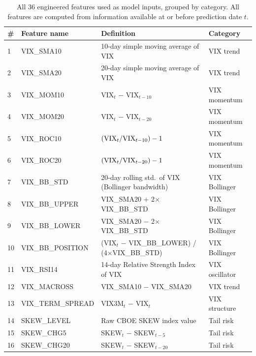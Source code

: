\documentclass[12pt]{article}
\begin{document}
\begin{table}[H]
\centering
\caption{All 36 engineered features used as model inputs, grouped by category. All features are computed from information available at or before prediction date $t$.}
\label{tab:features}
\small
\begin{tabular}{llll}
\toprule
\# & Feature name & Definition & Category \\
\midrule
1  & VIX\_SMA10        & 10-day simple moving average of VIX                        & VIX trend \\
2  & VIX\_SMA20        & 20-day simple moving average of VIX                        & VIX trend \\
3  & VIX\_MOM10        & VIX$_t$ $-$ VIX$_{t-10}$                                  & VIX momentum \\
4  & VIX\_MOM20        & VIX$_t$ $-$ VIX$_{t-20}$                                  & VIX momentum \\
5  & VIX\_ROC10        & $({\rm VIX}_t / {\rm VIX}_{t-10}) - 1$                     & VIX momentum \\
6  & VIX\_ROC20        & $({\rm VIX}_t / {\rm VIX}_{t-20}) - 1$                     & VIX momentum \\
7  & VIX\_BB\_STD      & 20-day rolling std.\ of VIX (Bollinger bandwidth)          & VIX Bollinger \\
8  & VIX\_BB\_UPPER    & VIX\_SMA20 $+$ 2$\times$VIX\_BB\_STD                       & VIX Bollinger \\
9  & VIX\_BB\_LOWER    & VIX\_SMA20 $-$ 2$\times$VIX\_BB\_STD                       & VIX Bollinger \\
10 & VIX\_BB\_POSITION & (VIX$_t$ $-$ VIX\_BB\_LOWER) / (4$\times$VIX\_BB\_STD)    & VIX Bollinger \\
11 & VIX\_RSI14        & 14-day Relative Strength Index of VIX                      & VIX oscillator \\
12 & VIX\_MACROSS      & VIX\_SMA10 $-$ VIX\_SMA20                                  & VIX trend \\
13 & VIX\_TERM\_SPREAD & VIX3M$_t$ $-$ VIX$_t$                                      & VIX structure \\
\midrule
14 & SKEW\_LEVEL       & Raw CBOE SKEW index value                                  & Tail risk \\
15 & SKEW\_CHG5        & SKEW$_t$ $-$ SKEW$_{t-5}$                                  & Tail risk \\
16 & SKEW\_CHG20       & SKEW$_t$ $-$ SKEW$_{t-20}$                                 & Tail risk \\

\end{tabular}
\end{table}
\end{document}
